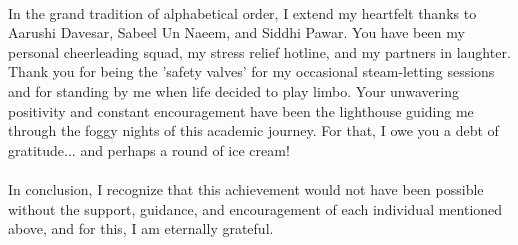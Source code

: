 \documentclass[12pt,a4paper]{article}
\begin{document}
\paragraph{}
In the grand tradition of alphabetical order, I extend my heartfelt thanks to Aarushi Davesar, Sabeel Un Naeem, and Siddhi Pawar. You have been my personal cheerleading squad, my stress relief hotline, and my partners in laughter. Thank you for being the 'safety valves' for my occasional steam-letting sessions and for standing by me when life decided to play limbo. Your unwavering positivity and constant encouragement have been the lighthouse guiding me through the foggy nights of this academic journey. For that, I owe you a debt of gratitude... and perhaps a round of ice cream!
\paragraph{}
In conclusion, I recognize that this achievement would not have been possible without the support, guidance, and encouragement of each individual mentioned above, and for this, I am eternally grateful.


\clearpage


%
%
%
%
%
%
%

\end{document}
